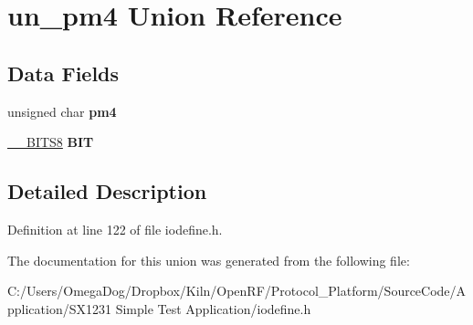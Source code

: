 \hypertarget{unionun__pm4}{\section{un\-\_\-pm4 Union Reference}
\label{unionun__pm4}
}
\subsection*{Data Fields}
\begin{DoxyCompactItemize}
\item 
\hypertarget{unionun__pm4_a769fa3819a429e9d6a7c6419054104bb}{unsigned char {\bfseries pm4}}\label{unionun__pm4_a769fa3819a429e9d6a7c6419054104bb}

\item 
\hypertarget{unionun__pm4_abd4410093c64f504404126cd4f75ca97}{\hyperlink{struct_____b_i_t_s8}{\-\_\-\-\_\-\-B\-I\-T\-S8} {\bfseries B\-I\-T}}\label{unionun__pm4_abd4410093c64f504404126cd4f75ca97}

\end{DoxyCompactItemize}


\subsection{Detailed Description}


Definition at line 122 of file iodefine.\-h.



The documentation for this union was generated from the following file\-:\begin{DoxyCompactItemize}
\item 
C\-:/\-Users/\-Omega\-Dog/\-Dropbox/\-Kiln/\-Open\-R\-F/\-Protocol\-\_\-\-Platform/\-Source\-Code/\-Application/\-S\-X1231 Simple Test Application/iodefine.\-h\end{DoxyCompactItemize}
